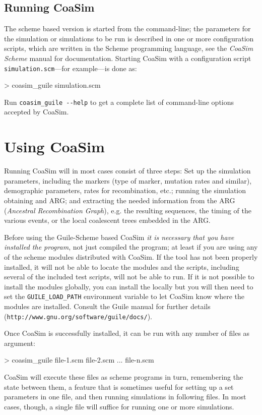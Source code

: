 \documentclass{manual}
\begin{document}
\subsection{Running CoaSim}

The scheme based version is started from the command-line; the
parameters for the simulation or simulations to be run is described in
one or more configuration scripts, which are written in the Scheme
programming language, see the \textit{CoaSim Scheme} manual for
documentation.  Starting CoaSim with a configuration script
\verb?simulation.scm?---for example---is done as:
\begin{code}
> coasim_guile simulation.scm
\end{code}
Run \verb?coasim_guile --help? to get a complete list of command-line
options accepted by CoaSim.

\section{Using CoaSim}

Running CoaSim will in most cases consist of three steps: Set up the
simulation parameters, including the markers (type of marker, mutation
rates and similar), demographic parameters, rates for recombination,
etc.; running the simulation obtaining and ARG; and extracting the
needed information from the ARG (\emph{Ancestral Recombination
  Graph}), e.g. the resulting sequences, the timing of the various
events, or the local coalescent trees embedded in the ARG.

Before using the Guile-Scheme based CoaSim \emph{it is necessary that
  you have installed the program}, not just compiled the program; at
least if you are using any of the scheme modules distributed with
CoaSim.  If the tool has not been properly installed, it will not be
able to locate the modules and the scripts, including several of the
included test scripts, will not be able to run.  If it is not possible
to install the modules globally, you can install the locally but you
will then need to set the \verb?GUILE_LOAD_PATH? environment variable
to let CoaSim know where the modules are installed.  Consult the Guile
manual for further details
(\verb?http://www.gnu.org/software/guile/docs/?).

Once CoaSim is successfully installed, it can be run with any number
of files as argument:
\begin{code}
> coasim_guile file-1.scm file-2.scm ... file-n.scm
\end{code}
CoaSim will execute these files as scheme programs in turn,
remembering the state between them, a feature that is sometimes useful
for setting up a set parameters in one file, and then running
simulations in following files.  In most cases, though, a single file
will suffice for running one or more simulations.
\end{document}
